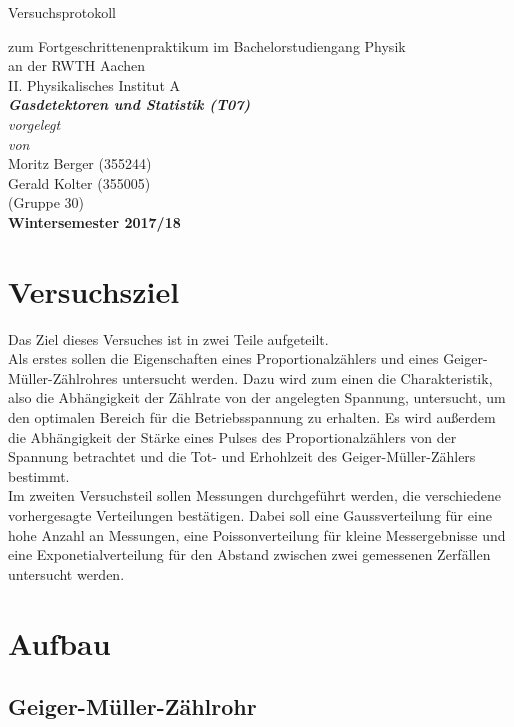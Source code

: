 \documentclass[12pt,a4paper]{article}
\author{Gerald}
\begin{document}
	\setlength{\parindent}{0pt} 
	\begin{center}
		{\LARGE Versuchsprotokoll}\\
		\begin{large}
			zum Fortgeschrittenenpraktikum im Bachelorstudiengang Physik\\[0.4cm]
			an der RWTH Aachen\\
			II. Physikalisches Institut A\\[5.5cm]
			\Large\textbf{\textsl{Gasdetektoren und Statistik (T07)}}\\[5.5cm]
			\normalsize\textit{vorgelegt\\von}\\[0.4cm]
			\large{Moritz Berger (355244)\\Gerald Kolter (355005)}\\(Gruppe 30)\\[2cm]
			\large \textbf{Wintersemester 2017/18}
		\end{large}
	\end{center}
	\newpage
	
	\tableofcontents
	\newpage
	
	
\section{Versuchsziel}
Das Ziel dieses Versuches ist in zwei Teile aufgeteilt.\\
Als erstes sollen die Eigenschaften eines Proportionalzählers und eines Geiger-Müller-Zählrohres untersucht werden. Dazu wird zum einen die Charakteristik, also die Abhängigkeit der Zählrate von der angelegten Spannung, untersucht, um den optimalen Bereich für die Betriebsspannung zu erhalten. Es wird außerdem die Abhängigkeit der Stärke eines Pulses des Proportionalzählers von der Spannung betrachtet und die Tot- und  Erhohlzeit des Geiger-Müller-Zählers bestimmt.\\
Im zweiten Versuchsteil sollen Messungen durchgeführt werden, die verschiedene vorhergesagte Verteilungen bestätigen. Dabei soll eine Gaussverteilung für eine hohe Anzahl an Messungen, eine Poissonverteilung für kleine Messergebnisse und eine Exponetialverteilung für den Abstand zwischen zwei gemessenen Zerfällen untersucht werden. 
\section{Aufbau}
\subsection{Geiger-Müller-Zählrohr}
\end{document}
